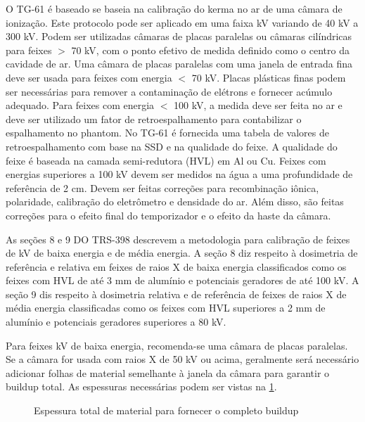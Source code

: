 \documentclass[11pt,a4paper]{article}
\begin{document}
	O  TG-61 é baseado se baseia na calibração do kerma no ar de uma câmara de ionização. Este protocolo pode ser aplicado em uma faixa kV variando de 40 kV a 300 kV. Podem ser utilizadas câmaras de placas paralelas ou câmaras cilíndricas para feixes $>$ 70 kV, com o ponto efetivo de medida definido como o centro da cavidade de ar. Uma câmara de placas paralelas com uma janela de entrada fina deve ser usada para feixes com energia  $<$ 70 kV. Placas plásticas finas podem ser necessárias para remover a contaminação de elétrons e fornecer acúmulo adequado. Para feixes com energia $<$ 100 kV, a medida deve ser feita no ar e deve ser utilizado um  fator de retroespalhamento  para contabilizar o espalhamento no phantom. No TG-61 é fornecida uma tabela de valores de retroespalhamento com base na SSD e na qualidade do feixe. A qualidade do feixe é baseada na camada semi-redutora (HVL) em Al ou Cu. Feixes com energias superiores a 100 kV devem ser medidos na água a uma profundidade de referência de 2 cm. Devem ser feitas correções para recombinação iônica, polaridade, calibração do eletrômetro e densidade do ar. Além disso, são feitas correções para o efeito final do temporizador e o efeito da haste da câmara.

	As seções 8 e 9 DO TRS-398 descrevem a metodologia para calibração de feixes de kV de baixa energia e de média energia. A seção 8 diz respeito à dosimetria de referência e relativa em feixes de raios X de baixa energia classificados como os feixes com HVL de até 3 mm de alumínio e potenciais geradores de até 100 kV.  A seção 9 dis respeito à dosimetria relativa e de referência de feixes de raios X de média energia classificadas como os feixes com HVL superiores a 2 mm de alumínio e potenciais geradores superiores a 80 kV.
	
	Para feixes kV de baixa energia, recomenda-se uma câmara de placas paralelas. Se a câmara for usada com raios X de 50 kV ou acima, geralmente será necessário adicionar folhas de material semelhante à janela da câmara para garantir o buildup total. As espessuras necessárias podem ser vistas na \ref{fig:kvEspessuraBuildup}.

	\begin{figure}[h]
		\centering
		\caption{Espessura total de material para fornecer o completo buildup}
		\label{fig:kvEspessuraBuildup}
	\end{figure}
	
\end{document}
